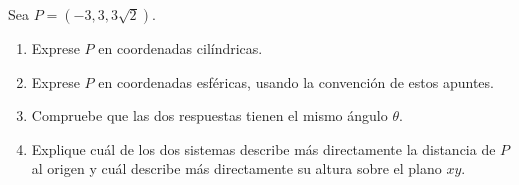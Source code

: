 Sea $P=(-3,3,3\sqrt{2})$.
\begin{enumerate}
    \item Exprese $P$ en coordenadas cilíndricas.
    \item Exprese $P$ en coordenadas esféricas, usando la convención de estos apuntes.
    \item Compruebe que las dos respuestas tienen el mismo ángulo $\theta$.
    \item Explique cuál de los dos sistemas describe más directamente la distancia de $P$ al origen y cuál describe más directamente su altura sobre el plano $xy$.
\end{enumerate}
